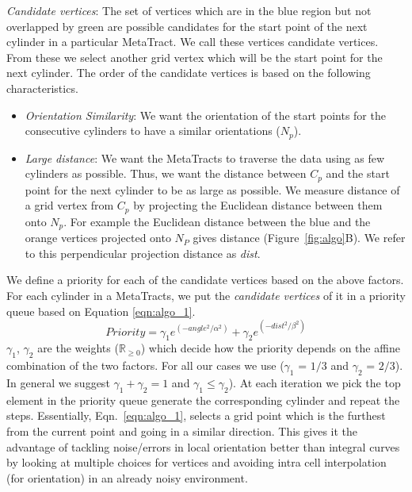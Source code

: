 \textit{Candidate vertices}: The set of vertices which are in the blue region but not overlapped by green are possible candidates for the start point of the next cylinder in a particular MetaTract. We call these vertices candidate vertices. From these we select another grid vertex which will be the start point for the next cylinder.
The order of the candidate vertices is based on the following characteristics.
\begin{itemize}
\item \textit{Orientation Similarity}: We want the orientation of the start points for the consecutive cylinders to have a similar orientations ($N_p$). 


\item \textit{Large distance}: We want the MetaTracts to traverse the data using as few cylinders as possible. Thus, we want the distance between $C_p$ and the start point for the next cylinder to be as large as possible. We measure distance of a grid vertex from $C_p$ by projecting the Euclidean distance between them onto $N_p$. For example the Euclidean distance between the blue and the orange vertices projected onto $N_P$ gives distance (Figure~\ref{fig:algo}B). We refer to this perpendicular projection distance as \textit{dist}. 
\end{itemize}
We define a priority  for each of the candidate vertices based on the above factors.
For each cylinder in a MetaTracts, we put the \textit{candidate vertices} of it in a priority queue based on Equation \ref{eqn:algo_1}.
\begin{equation}
Priority = \gamma_1 e^{(-angle^2 / \alpha^2)} + \gamma_2e^{(-dist^2 / \beta^2)}
\label{eqn:algo_1}
\end{equation}
 $\gamma_1$, $\gamma_2$ are the  weights ($\mathbb{R}_{\ge 0}$)  which decide how the priority depends on the affine combination of the two factors. For all our cases we use ($\gamma_1$ = $1 / 3 $ and $\gamma_2$ = $2 / 3$). In general we suggest $\gamma_1 +\gamma_2 = 1 $ and $\gamma_1 \leq \gamma_2$). At each iteration we pick the top element in the priority queue generate the corresponding cylinder and repeat the steps. Essentially, Eqn.~\ref{eqn:algo_1}, selects a grid point which is the furthest from the current point and going in a similar direction. This gives it the advantage of tackling noise/errors in local orientation better than integral curves by looking at multiple choices for vertices and avoiding intra cell interpolation (for orientation) in an already noisy environment. 
 
